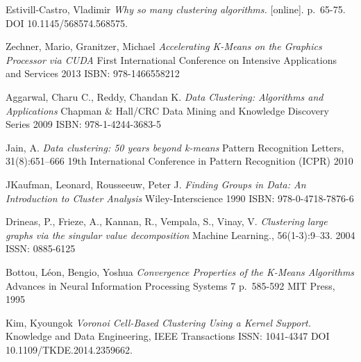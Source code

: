 
\def\bibname{Bibliography}
\begin{thebibliography}{99}
\addcontentsline{toc}{chapter}{\bibname}


{\sc Estivill-Castro,} Vladimir
\emph{Why so many clustering algorithms.}
[online]. p.~65-75. DOI 10.1145/568574.568575.

{\sc Zechner,} Mario, {\sc Granitzer, } Michael
\emph{Accelerating K-Means on the Graphics Processor via CUDA}
First International Conference on Intensive Applications and Services
2013
ISBN: 978-1466558212 

{\sc Aggarwal,} Charu C., {\sc Reddy, } Chandan K.
\emph{Data Clustering: Algorithms and Applications}
Chapman \& Hall/CRC Data Mining and Knowledge Discovery Series
2009
ISBN: 978-1-4244-3683-5

{\sc Jain,} A.
\emph{Data clustering: 50 years beyond k-means}
Pattern Recognition Letters, 31(8):651–666
19th International Conference in Pattern Recognition (ICPR)
2010

{\sc JKaufman,} Leonard, {\sc Rousseeuw,} Peter J.
\emph{Finding Groups in Data: An Introduction to Cluster Analysis}
Wiley-Interscience
1990
ISBN: 978-0-4718-7876-6

{\sc Drineas,} P., {\sc Frieze,} A., {\sc Kannan,} R., {\sc Vempala,}  S., {\sc Vinay,}  V.
\emph{Clustering large graphs via the singular value decomposition}
Machine Learning., 56(1-3):9–33.
2004
ISSN: 0885-6125

{\sc Bottou,} L\'{e}on, {\sc Bengio,} Yoshua
\emph{Convergence Properties of the K-Means Algorithms}
Advances in Neural Information Processing Systems 7
p.~585-592
MIT Press, 1995

{\sc Kim,} Kyoungok
\emph{Voronoi Cell-Based Clustering Using a Kernel Support.}
Knowledge and Data Engineering, IEEE Transactions
ISSN: 1041-4347
DOI 10.1109/TKDE.2014.2359662. 


\end{thebibliography}
